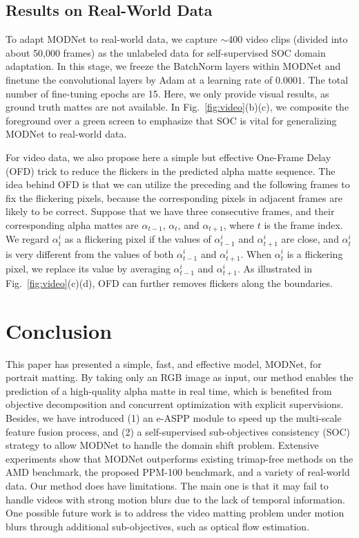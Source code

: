 \documentclass[letterpaper]{article} \usepackage{aaai22}  \usepackage{times}  \usepackage{helvet}  \usepackage{courier}  \usepackage[hyphens]{url}  \usepackage{graphicx} \urlstyle{rm} \def\UrlFont{\rm}  \usepackage{natbib}  \usepackage{caption} \usepackage{booktabs}
\begin{document}
\subsection{Results on Real-World Data}\label{sec:RoRWD}
To adapt MODNet to real-world data, we capture $\sim$400 video clips (divided into about 50,000 frames) as the unlabeled data for self-supervised SOC domain adaptation. In this stage, we freeze the BatchNorm layers within MODNet and finetune the convolutional layers by Adam at a learning rate of $0.0001$. The total number of fine-tuning epochs are 15. Here, we only provide visual results, 
as ground truth mattes are not available. In Fig.~\ref{fig:video}(b)(c), we composite the foreground over a green screen to emphasize that SOC is vital for generalizing MODNet to real-world data. 



For video data, we also propose here a simple but effective One-Frame Delay (OFD) trick to reduce the flickers in the predicted alpha matte sequence. The idea behind OFD is that we can utilize the preceding and the following frames to fix the flickering pixels, because the corresponding pixels in adjacent frames are likely to be correct.
Suppose that we have three consecutive frames, and their corresponding alpha mattes are $\alpha_{t-1}$, $\alpha_{t}$, and $\alpha_{t+1}$, where $t$ is the frame index. We regard $\alpha_{t}^{i}$ as a flickering pixel if the values of $\alpha_{t-1}^{i}$ and $\alpha_{t+1}^{i}$ are close, and $\alpha_{t}^{i}$ is very different from the values of both $\alpha_{t-1}^{i}$ and $\alpha_{t+1}^{i}$. When $\alpha_{t}^{i}$ is a flickering pixel, we replace its value by averaging $\alpha_{t-1}^{i}$ and $\alpha_{t+1}^{i}$. As illustrated in Fig.~\ref{fig:video}(c)(d), OFD can further removes flickers along the boundaries. 








\section{Conclusion}
This paper has presented a simple, fast, and effective model, MODNet, for portrait matting. By taking only an RGB image as input, our method enables the prediction of a high-quality alpha matte in real time, which is benefited from objective decomposition and concurrent optimization with explicit supervisions. Besides, we have introduced (1) an e-ASPP module to speed up the multi-scale feature fusion process, and (2) a self-supervised sub-objectives consistency (SOC) strategy to allow MODNet to handle the domain shift problem. Extensive experiments show that MODNet outperforms existing trimap-free methods on the AMD benchmark, the proposed PPM-100 benchmark, and a variety of real-world data. Our method does have limitations. The main one is that it may fail to handle videos with strong motion blurs due to the lack of temporal information. One possible future work is to address the video matting problem under motion blurs through additional sub-objectives, such as optical flow estimation. 
\end{document}
